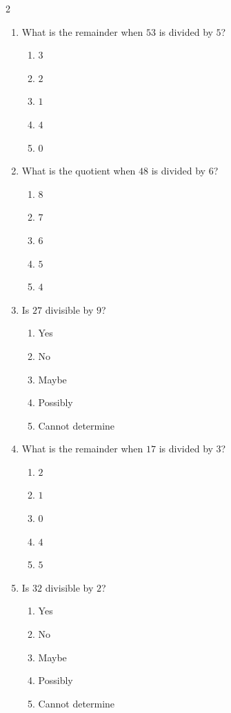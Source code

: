 \documentclass[10pt]{article}
\begin{document}
\begin{multicols}{2}
\begin{enumerate}[label=\textbf{Q\arabic*.}, leftmargin=*, itemsep=6pt, parsep=0pt]
  \item \small What is the remainder when $53$ is divided by $5$?
  \begin{enumerate}[label=(\Alph*), leftmargin=0.6cm, nosep, itemsep=2pt]
    \item $3$
    \item $2$
    \item $1$
    \item $4$
    \item $0$
  \end{enumerate}

  \item \small What is the quotient when $48$ is divided by $6$?
  \begin{enumerate}[label=(\Alph*), leftmargin=0.6cm, nosep, itemsep=2pt]
    \item $8$
    \item $7$
    \item $6$
    \item $5$
    \item $4$
  \end{enumerate}

  \item \small Is $27$ divisible by $9$?
  \begin{enumerate}[label=(\Alph*), leftmargin=0.6cm, nosep, itemsep=2pt]
    \item Yes
    \item No
    \item Maybe
    \item Possibly
    \item Cannot determine
  \end{enumerate}

  \item \small What is the remainder when $17$ is divided by $3$?
  \begin{enumerate}[label=(\Alph*), leftmargin=0.6cm, nosep, itemsep=2pt]
    \item $2$
    \item $1$
    \item $0$
    \item $4$
    \item $5$
  \end{enumerate}

  \item \small Is $32$ divisible by $2$?
  \begin{enumerate}[label=(\Alph*), leftmargin=0.6cm, nosep, itemsep=2pt]
    \item Yes
    \item No
    \item Maybe
    \item Possibly
    \item Cannot determine
  \end{enumerate}

\end{enumerate}
\end{multicols}
\end{document}
